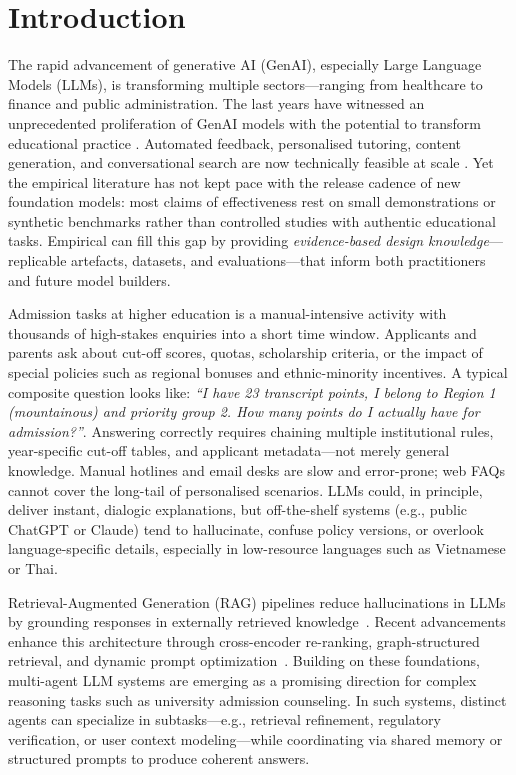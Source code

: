 \documentclass[runningheads]{llncs}
\begin{document}
\section{Introduction}
\label{sec:intro}

The rapid advancement of generative AI (GenAI), especially Large Language Models (LLMs), is transforming multiple sectors—ranging from healthcare to finance and public administration. The last years have witnessed an unprecedented proliferation of GenAI models with the potential to transform educational practice \cite{su__unlocking_2023,mittal_comprehensive_2024,alasadi_generative_2023,li_retrieval-augmented_2025}.
Automated feedback, personalised tutoring, content generation, and conversational search are now technically feasible at scale \cite{alasadi_generative_2023}.
Yet the empirical literature has not kept pace with the release cadence of new foundation models: most claims of effectiveness rest on small demonstrations or synthetic benchmarks rather than controlled studies with authentic educational tasks. Empirical can fill this gap by providing \emph{evidence-based design knowledge}—replicable artefacts, datasets, and evaluations—that inform both practitioners and future model builders.

Admission tasks at higher education is a manual-intensive activity with thousands of high-stakes enquiries into a short time window. Applicants and parents ask about cut-off scores, quotas, scholarship criteria, or the impact of special policies such as regional bonuses and ethnic-minority incentives.
A typical composite question looks like: \emph{“I have 23 transcript points, I belong to Region 1 (mountainous) and priority group 2. How many points do I actually have for admission?”}. Answering correctly requires chaining multiple institutional rules, year-specific cut-off tables, and applicant metadata—not merely general knowledge. Manual hotlines and email desks are slow and error-prone; web FAQs cannot cover the long-tail of personalised scenarios. LLMs could, in principle, deliver instant, dialogic explanations, but off-the-shelf systems (e.g., public ChatGPT or Claude) tend to hallucinate, confuse policy versions, or overlook language-specific details, especially in low-resource languages such as Vietnamese or Thai.

Retrieval-Augmented Generation (RAG) pipelines reduce hallucinations in LLMs by grounding responses in externally retrieved knowledge~\cite{lewis_retrieval-augmented_2020}. Recent advancements enhance this architecture through cross-encoder re-ranking, graph-structured retrieval, and dynamic prompt optimization~\cite{mavromatis_gnn-rag_2024,mishra_searchd_2024}. Building on these foundations, multi-agent LLM systems are emerging as a promising direction for complex reasoning tasks such as university admission counseling. In such systems, distinct agents can specialize in subtasks—e.g., retrieval refinement, regulatory verification, or user context modeling—while coordinating via shared memory or structured prompts to produce coherent answers.
\end{document}
